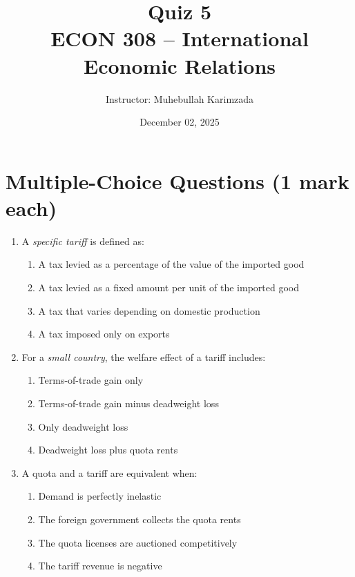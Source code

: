 \documentclass[12pt]{article}
\title{Quiz 5\\ \vspace{5pt} \Large ECON 308 -- International Economic Relations}
\author{Instructor: Muhebullah Karimzada}
\date{December 02,  2025}
\begin{document}
\maketitle

\section*{Multiple-Choice Questions (1 mark each)}



\begin{enumerate}[label=\textbf{\arabic*.}]

\item A \textit{specific tariff} is defined as:
\begin{enumerate}[label=\Alph*.]
\item A tax levied as a percentage of the value of the imported good
\item A tax levied as a fixed amount per unit of the imported good
\item A tax that varies depending on domestic production
\item A tax imposed only on exports
\end{enumerate}
\vspace{0.1 cm}

\item For a \textit{small country}, the welfare effect of a tariff includes:
\begin{enumerate}[label=\Alph*.]
\item Terms-of-trade gain only
\item Terms-of-trade gain minus deadweight loss
\item Only deadweight loss
\item Deadweight loss plus quota rents
\end{enumerate}

\vspace{0.1 cm}
\item A quota and a tariff are equivalent when:
\begin{enumerate}[label=\Alph*.]
\item Demand is perfectly inelastic
\item The foreign government collects the quota rents
\item The quota licenses are auctioned competitively
\item The tariff revenue is negative
\end{enumerate}
\vspace{0.1 cm}


\end{enumerate}
\end{document}
